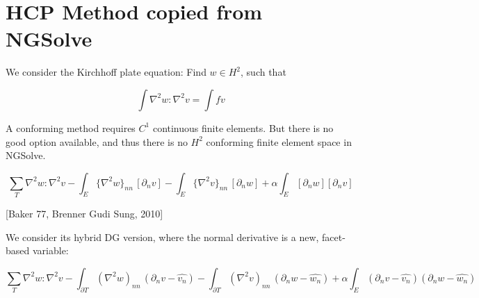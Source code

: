 \section{HCP Method copied from NGSolve}%
\label{ssub:hc0ip_method_from_ngsolve}

We consider the Kirchhoff plate equation: Find $w \in H^2$, such that

$$
\int \nabla^2 w : \nabla^2 v = \int f v
$$

A conforming method requires $C^1$ continuous finite elements. But there is no good option available, and thus there is no $H^2$ conforming finite element space in NGSolve.

$$
\sum_T \nabla^2 w : \nabla^2 v
- \int_{E} \{\nabla^2 w\}_{nn} \, [\partial_n v]
- \int_{E} \{\nabla^2 v\}_{nn} \, [\partial_n w] + \alpha \int_E  [\partial_n w]  [\partial_n v]
$$

[Baker 77, Brenner Gudi Sung, 2010]

We consider its hybrid DG version, where the normal derivative is a new, facet-based variable:


$$
\sum_T \nabla^2 w : \nabla^2 v
- \int_{\partial T} (\nabla^2 w)_{nn} \, (\partial_n v - \widehat{v_n})
- \int_{\partial T} (\nabla^2 v)_{nn} \, (\partial_n w - \widehat{w_n}) + \alpha \int_E (\partial_n v - \widehat{v_n}) (\partial_n w - \widehat{w_n})
$$






